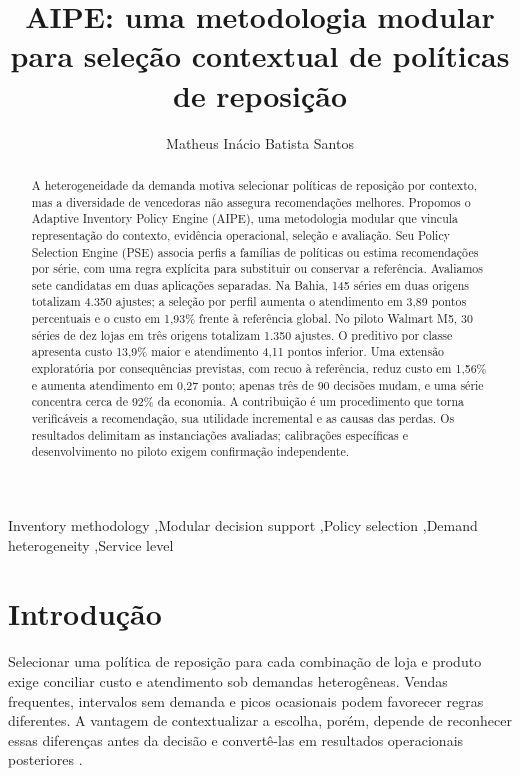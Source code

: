 \documentclass[preprint,12pt]{elsarticle}
\begin{document}
\begin{frontmatter}
\title{AIPE: uma metodologia modular para seleção contextual de políticas de reposição}
\author[ufal]{Matheus Inácio Batista Santos}
\begin{abstract}
A heterogeneidade da demanda motiva selecionar políticas de reposição por contexto, mas a diversidade de vencedoras não assegura recomendações melhores. Propomos o Adaptive Inventory Policy Engine (AIPE), uma metodologia modular que vincula representação do contexto, evidência operacional, seleção e avaliação. Seu Policy Selection Engine (PSE) associa perfis a famílias de políticas ou estima recomendações por série, com uma regra explícita para substituir ou conservar a referência. Avaliamos sete candidatas em duas aplicações separadas. Na Bahia, 145 séries em duas origens totalizam 4.350 ajustes; a seleção por perfil aumenta o atendimento em 3,89 pontos percentuais e o custo em 1,93\% frente à referência global. No piloto Walmart M5, 30 séries de dez lojas em três origens totalizam 1.350 ajustes. O preditivo por classe apresenta custo 13,9\% maior e atendimento 4,11 pontos inferior. Uma extensão exploratória por consequências previstas, com recuo à referência, reduz custo em 1,56\% e aumenta atendimento em 0,27 ponto; apenas três de 90 decisões mudam, e uma série concentra cerca de 92\% da economia. A contribuição é um procedimento que torna verificáveis a recomendação, sua utilidade incremental e as causas das perdas. Os resultados delimitam as instanciações avaliadas; calibrações específicas e desenvolvimento no piloto exigem confirmação independente.

\end{abstract}
\begin{keyword}
Inventory methodology \sep Modular decision support \sep Policy selection \sep Demand heterogeneity \sep Service level
\end{keyword}
\end{frontmatter}

\section{Introdução}
Selecionar uma política de reposição para cada combinação de loja e produto exige conciliar custo e atendimento sob demandas heterogêneas. Vendas frequentes, intervalos sem demanda e picos ocasionais podem favorecer regras diferentes. A vantagem de contextualizar a escolha, porém, depende de reconhecer essas diferenças antes da decisão e convertê-las em resultados operacionais posteriores \cite{Axsater2006InventoryControl}.
\end{document}
